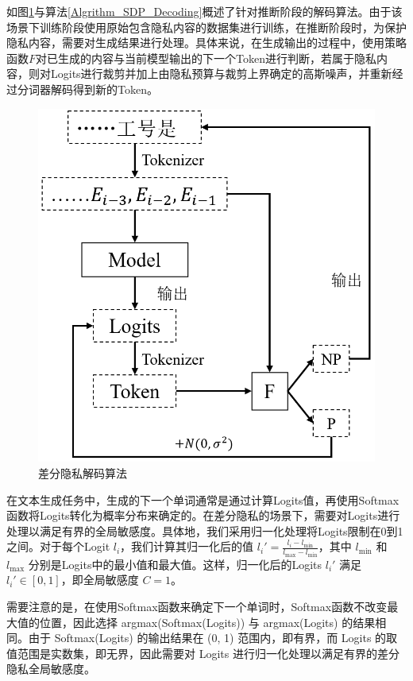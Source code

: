 如图\ref{Chap5_PDP_Decode}与算法\ref{Algrithm_SDP_Decoding}概述了针对推断阶段的解码算法。由于该场景下训练阶段使用原始包含隐私内容的数据集进行训练，在推断阶段时，为保护隐私内容，需要对生成结果进行处理。具体来说，在生成输出的过程中，使用策略函数$F$对已生成的内容与当前模型输出的下一个Token进行判断，若属于隐私内容，则对Logits进行裁剪并加上由隐私预算与裁剪上界确定的高斯噪声，并重新经过分词器解码得到新的Token。

\begin{figure}[h]
	\centering
	\includegraphics[width=0.5\linewidth]{figures/Chap5_PDP_Decode.png}
	\caption{差分隐私解码算法}
	\label{Chap5_PDP_Decode}
\end{figure}


在文本生成任务中，生成的下一个单词通常是通过计算Logits值，再使用Softmax函数将Logits转化为概率分布来确定的。在差分隐私的场景下，需要对Logits进行处理以满足有界的全局敏感度。具体地，我们采用归一化处理将Logits限制在0到1之间。对于每个Logit $l_i$，我们计算其归一化后的值 $l_i' = \frac{l_i - l_{\text{min}}}{l_{\text{max}} - l_{\text{min}}}$，其中 $l_{\text{min}}$ 和 $l_{\text{max}}$ 分别是Logits中的最小值和最大值。这样，归一化后的Logits $l_i'$ 满足 $l_i' \in [0, 1]$，即全局敏感度 $C=1$。

需要注意的是，在使用Softmax函数来确定下一个单词时，Softmax函数不改变最大值的位置，因此选择 argmax(Softmax(Logits)) 与 argmax(Logits) 的结果相同。由于 Softmax(Logits) 的输出结果在 (0, 1) 范围内，即有界，而 Logits 的取值范围是实数集，即无界，因此需要对 Logits 进行归一化处理以满足有界的差分隐私全局敏感度。



